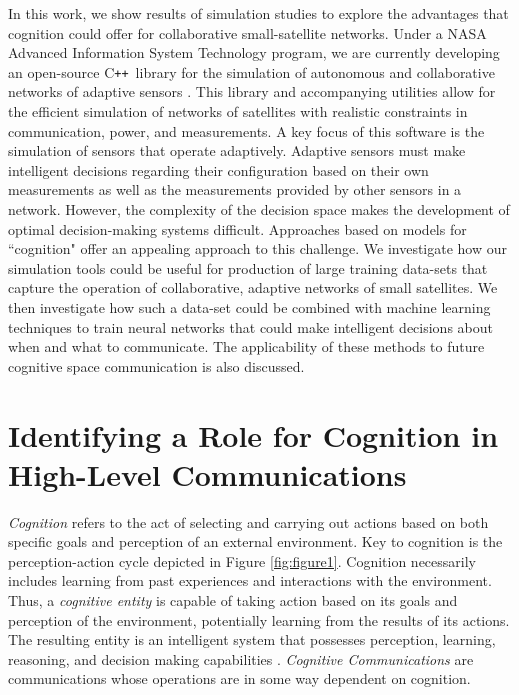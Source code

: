 \documentclass[conference]{IEEEtran}
\newcommand{\cpp}{C\texttt{++}~}
\begin{document}
In this work, we show results of simulation studies to explore the advantages
that cognition could offer for collaborative small-satellite networks.  Under a
NASA Advanced Information System Technology program, we are currently developing
an open-source \cpp library for the simulation of autonomous and collaborative
networks of adaptive sensors \cite{ref6}.  This library and accompanying
utilities allow for the efficient simulation of networks of satellites with
realistic constraints in communication, power, and measurements.  A key focus of
this software is the simulation of sensors that operate adaptively.  Adaptive
sensors must make intelligent decisions regarding their configuration based on
their own measurements as well as the measurements provided by other sensors in
a network.  However, the complexity of the decision space makes the
development of optimal decision-making systems difficult.  Approaches based on models for
``cognition" offer an appealing approach to this challenge.  We investigate
how our simulation tools could be useful for production of large training
data-sets that capture the operation of collaborative, adaptive networks of
small satellites.  We then investigate how such a data-set could be combined
with machine learning techniques to train neural networks that could make
intelligent decisions about when and what to communicate.  The applicability of
these methods to future cognitive space communication is also discussed.


\section{Identifying a Role for Cognition in High-Level Communications} \label{sec:hlc}

\textit{Cognition} refers to the act of selecting and carrying out actions based
on both specific {\color{black} goals and perception of an external
environment}.  Key to cognition is the perception-action cycle depicted in
Figure \ref{fig:figure1}.  Cognition necessarily includes learning from past
experiences and {\color{black} interactions with the environment}.  Thus, a
\textit{cognitive entity} is capable of taking action based on its
{\color{black} goals and perception of the environment}, potentially learning
from the results of its actions.  The resulting entity is an intelligent system that possesses
perception, learning, reasoning, and decision making capabilities
\cite{ref7}. \textit{Cognitive Communications} are communications whose
operations are in some way dependent on cognition.
\end{document}
